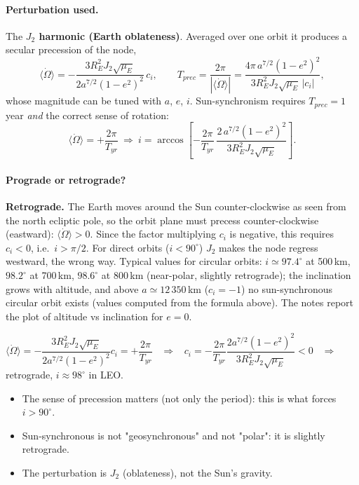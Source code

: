 \paragraph{Perturbation used.} The \textbf{$J_2$ harmonic (Earth oblateness)}. Averaged over one orbit it produces a secular precession
of the node,
\begin{equation}
\langle\dot{\Omega}\rangle=-\frac{3R_{E}^{2}J_{2}\sqrt{\mu_{E}}}{2a^{7/2}(1-e^{2})^{2}}\,c_{i},\qquad
T_{prec}=\frac{2\pi}{|\langle\dot\Omega\rangle|}=\frac{4\pi\,a^{7/2}(1-e^2)^2}{3R_E^2J_2\sqrt{\mu_E}\,|c_i|},
\end{equation}
whose magnitude can be tuned with $a$, $e$, $i$. Sun-synchronism requires $T_{prec}=1$ year \emph{and} the correct sense of rotation:
\begin{equation}
\langle\dot{\Omega}\rangle=+\frac{2\pi}{T_{yr}}\ \Longrightarrow\
i=\arccos\!\left[-\frac{2\pi}{T_{yr}}\,\frac{2\,a^{7/2}(1-e^{2})^{2}}{3R_{E}^{2}J_{2}\sqrt{\mu_{E}}}\right].
\end{equation}

\paragraph{Prograde or retrograde?} \textbf{Retrograde.} The Earth moves around the Sun counter-clockwise as seen from the north
ecliptic pole, so the orbit plane must precess counter-clockwise (eastward): $\langle\dot\Omega\rangle>0$. Since the factor multiplying
$c_i$ is negative, this requires $c_i<0$, i.e.\ $i>\pi/2$. For direct orbits ($i<90^\circ$) $J_2$ makes the node regress westward,
the wrong way. Typical values for circular orbits: $i\simeq97.4^\circ$ at 500\,km, $98.2^\circ$ at 700\,km, $98.6^\circ$ at 800\,km
(near-polar, slightly retrograde); the inclination grows with altitude, and above $a\simeq12\,350$\,km ($c_i=-1$) no sun-synchronous
circular orbit exists \notinnotes (values computed from the formula above). The notes report the plot of altitude vs inclination for $e=0$.

\begin{keyf}
$\langle\dot\Omega\rangle=-\dfrac{3R_E^2J_2\sqrt{\mu_E}}{2a^{7/2}(1-e^2)^2}c_i=+\dfrac{2\pi}{T_{yr}}$ \ $\Rightarrow$ \
$c_i=-\dfrac{2\pi}{T_{yr}}\dfrac{2a^{7/2}(1-e^2)^2}{3R_E^2J_2\sqrt{\mu_E}}<0$ \ $\Rightarrow$ retrograde, $i\approx98^\circ$ in LEO.
\end{keyf}

\pitfalls
\begin{itemize}
\item The sense of precession matters (not only the period): this is what forces $i>90^\circ$.
\item Sun-synchronous is not "geosynchronous" and not "polar": it is slightly retrograde.
\item The perturbation is $J_2$ (oblateness), not the Sun's gravity.
\end{itemize}

